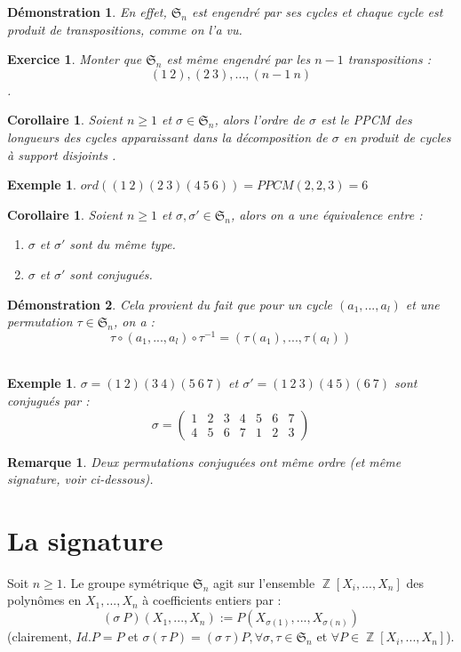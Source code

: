 \documentclass[a4paper, oneside]{report}
\theoremstyle{break}
\newtheorem{cor}[thm]{Corollaire}
\newtheorem{exem}[thm]{Exemple}
\newtheorem{exo}[thm]{Exercice}
\newtheorem{remar}[thm]{Remarque}
\newtheorem*{demo}{Démonstration}
\newcommand{\pcsd}{produit de cycles à support disjoints }
\DeclareMathOperator{\Z}{\mathbb{Z}}
\renewcommand{\S}{\mathfrak{S}}
\begin{document}
\begin{demo}
	En effet, $\S_n$ est engendré par ses cycles et chaque cycle est produit de transpositions, comme on l'a vu.
\end{demo}

\begin{exo}
	Monter que $\S_n$ est même engendré par les $n-1$ transpositions :
	$$(1~2),(2~3),...,(n-1~n)$$.
\end{exo}

\begin{cor}
	Soient $n\geq 1$ et $\sigma\in \S_n$, alors l'ordre de $\sigma$ est le PPCM des longueurs des cycles apparaissant dans la décomposition de $\sigma$ en \pcsd.
\end{cor}

\begin{exem}
	$ord((1~2)(2~3)(4~5~6)) = PPCM(2,2,3)=6$
\end{exem}

\begin{cor}
	Soient $n\geq 1$ et $\sigma, \sigma ' \in \S_n$, alors on a une équivalence entre :
	\begin{enumerate}
		\item $\sigma$ et $\sigma '$ sont du même type.
		\item $\sigma$ et $\sigma '$ sont conjugués.
	\end{enumerate}
\end{cor}

\begin{demo}
	Cela provient du fait que pour un cycle $(a_1,...,a_l)$ et une permutation $\tau\in \S_n$, on a :
	$$\tau \circ (a_1,...,a_l) \circ \tau^{-1}=(\tau(a_1),...,\tau(a_l))$$
~
\end{demo}

\begin{exem}
	$\sigma = (1~2)(3~4)(5~6~7)$ et $\sigma '=(1~2~3)(4~5)(6~7)$ sont conjugués par :
	$$\sigma = \left(\begin{array}{lllllll}
	1&2&3&4&5&6&7\\
	4&5&6&7&1&2&3
	\end{array}\right)$$
\end{exem}

\begin{remar}
	Deux permutations conjuguées ont même ordre (et même signature, voir ci-dessous).
\end{remar}

\section{La signature}
Soit $n\geq 1$. Le groupe symétrique $\S_n$ agit sur l'ensemble $\Z[X_i,...,X_n]$ des polynômes en $X_1,...,X_n$ à coefficients entiers par :
$$(\sigma~P)(X_1,...,X_n):= P(X_{\sigma(1)},...,X_{\sigma(n)})$$
(clairement, $Id.P=P$ et $\sigma(\tau~P)=(\sigma~\tau)P, \forall \sigma,\tau \in \S_n$ et $\forall P\in \Z[X_i,...,X_n]$).\\
\end{document}
